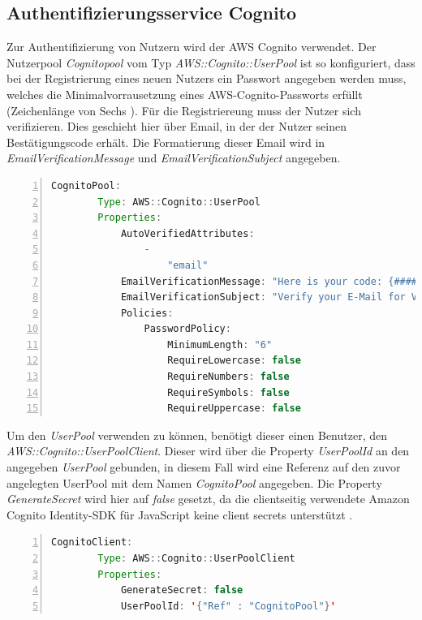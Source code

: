 \documentclass[a4paper, 12pt]{scrreprt}
\renewcommand\_{\textunderscore\allowbreak}
\begin{document}
\subsection{Authentifizierungsservice Cognito}
Zur Authentifizierung von Nutzern wird der AWS Cognito verwendet. Der Nutzerpool \textit{Cognitopool} vom Typ \textit{AWS::Cognito::UserPool} ist so konfiguriert, dass bei der Registrierung eines neuen Nutzers ein Passwort angegeben werden muss, welches die Minimalvorrausetzung eines AWS-Cognito-Passworts erfüllt (Zeichenlänge von Sechs \cite{AWSD}). Für die Registriereung muss der Nutzer sich verifizieren. Dies geschieht hier über Email, in der der Nutzer seinen Bestätigungscode erhält. Die Formatierung dieser Email wird in \textit{EmailVerificationMessage} und \textit{EmailVerificationSubject} angegeben.  
\begin{lstlisting}[xleftmargin=\parindent,numbers=left,numberstyle=\small,numbersep=8pt,frame=L,mathescape=true, basicstyle=\small, language=Java, lineskip={1.0pt}]
CognitoPool:
        Type: AWS::Cognito::UserPool
        Properties:
            AutoVerifiedAttributes:
                -
                    "email"
            EmailVerificationMessage: "Here is your code: {####}"
            EmailVerificationSubject: "Verify your E-Mail for VD"
            Policies:
                PasswordPolicy:
                    MinimumLength: "6"
                    RequireLowercase: false
                    RequireNumbers: false
                    RequireSymbols: false
                    RequireUppercase: false

\end{lstlisting}
\bigskip
\noindent Um den \textit{UserPool} verwenden zu können, benötigt dieser einen Benutzer, den \textit{AWS::Cognito::UserPoolClient}. Dieser wird über die Property \textit{UserPoolId} an den angegeben \textit{UserPool} gebunden, in diesem Fall wird eine Referenz auf den zuvor angelegten UserPool mit dem Namen \textit{CognitoPool} angegeben. Die Property \textit{GenerateSecret} wird hier auf \textit{false} gesetzt, da die clientseitig verwendete Amazon Cognito Identity-SDK für JavaScript keine client secrets unterstützt \cite{AWSAmplify}.

\begin{lstlisting}[xleftmargin=\parindent,numbers=left,numberstyle=\small,numbersep=8pt,frame=L,mathescape=true, basicstyle=\small, language=Java, lineskip={1.0pt}]
    CognitoClient:
        Type: AWS::Cognito::UserPoolClient
        Properties:
            GenerateSecret: false
            UserPoolId: '{"Ref" : "CognitoPool"}'
\end{lstlisting} 
\end{document}
